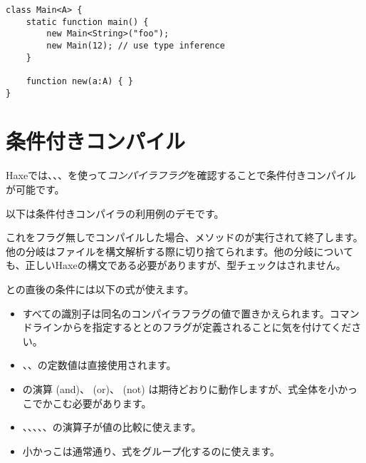 \begin{lstlisting}
class Main<A> {
    static function main() {
        new Main<String>("foo");
        new Main(12); // use type inference
    }

    function new(a:A) { }
}
\end{lstlisting}

\section{条件付きコンパイル}
\label{lf-condition-compilation}

Haxeでは、、、を使って\emph{コンパイラフラグ}を確認することで条件付きコンパイルが可能です。


以下は条件付きコンパイラの利用例のデモです。


これをフラグ無しでコンパイルした場合、メソッドのが実行されて終了します。他の分岐はファイルを構文解析する際に切り捨てられます。他の分岐についても、正しいHaxeの構文である必要がありますが、型チェックはされません。

との直後の条件には以下の式が使えます。

\begin{itemize}
	\item すべての識別子は同名のコンパイラフラグの値で置きかえられます。コマンドラインからを指定するととのフラグが定義されることに気を付けてください。
	\item {}、、の定数値は直接使用されます。
		\item {}の演算\expr{\&\&} (and)、\expr{||} (or)、\expr{!} (not) は期待どおりに動作しますが、式全体を小かっこでかこむ必要があります。
	\item \expr{==}、\expr{!=}、\expr{>}、\expr{>=}、\expr{<}、\expr{<=}の演算子が値の比較に使えます。
	\item 小かっこ\expr{()}は通常通り、式をグループ化するのに使えます。
\end{itemize}


